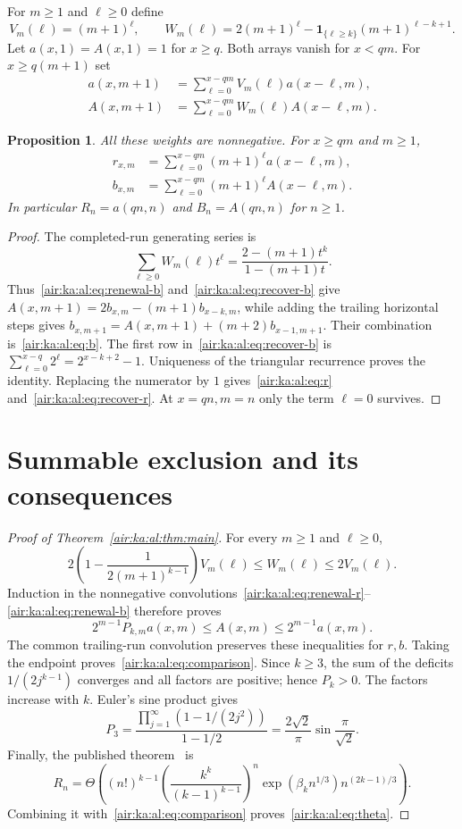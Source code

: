 \documentclass[11pt,letterpaper]{article}
\numberwithin{equation}{section}
\newtheorem{proposition}[theorem]{Proposition}
\theoremstyle{remark}
\begin{document}
For $m\ge1$ and $\ell\ge0$ define
\begin{equation}\label{air:ka:al:eq:weights}
V_m(\ell)=(m+1)^\ell,\qquad
W_m(\ell)=2(m+1)^\ell-
\mathbf1_{\{\ell\ge k\}}(m+1)^{\ell-k+1}.
\end{equation}
Let $a(x,1)=A(x,1)=1$ for $x\ge q$. Both arrays vanish for $x<qm$.
For $x\ge q(m+1)$ set
\begin{align}
a(x,m+1)&=\sum_{\ell=0}^{x-qm}V_m(\ell)a(x-\ell,m),\label{air:ka:al:eq:renewal-r}\\
A(x,m+1)&=\sum_{\ell=0}^{x-qm}W_m(\ell)A(x-\ell,m).\label{air:ka:al:eq:renewal-b}
\end{align}
\begin{proposition}\label{air:ka:al:prop:renewal}
All these weights are nonnegative. For $x\ge qm$ and $m\ge1$,
\begin{align}
r_{x,m}&=\sum_{\ell=0}^{x-qm}(m+1)^\ell a(x-\ell,m),\label{air:ka:al:eq:recover-r}\\
b_{x,m}&=\sum_{\ell=0}^{x-qm}(m+1)^\ell A(x-\ell,m).\label{air:ka:al:eq:recover-b}
\end{align}
In particular $R_n=a(qn,n)$ and $B_n=A(qn,n)$ for $n\ge1$.
\end{proposition}
\begin{proof}
The completed-run generating series is
\[
\sum_{\ell\ge0}W_m(\ell)t^\ell
=\frac{2-(m+1)t^k}{1-(m+1)t}.
\]
Thus~\eqref{air:ka:al:eq:renewal-b} and~\eqref{air:ka:al:eq:recover-b} give
$A(x,m+1)=2b_{x,m}-(m+1)b_{x-k,m}$, while adding the trailing
horizontal steps gives
$b_{x,m+1}=A(x,m+1)+(m+2)b_{x-1,m+1}$.
Their combination is~\eqref{air:ka:al:eq:b}. The first row in~\eqref{air:ka:al:eq:recover-b}
is $\sum_{\ell=0}^{x-q}2^\ell=2^{x-k+2}-1$.
Uniqueness of the triangular recurrence proves the identity.
Replacing the numerator by $1$ gives~\eqref{air:ka:al:eq:r} and~\eqref{air:ka:al:eq:recover-r}.
At $x=qn,m=n$ only the term $\ell=0$ survives.
\end{proof}

\section{Summable exclusion and its consequences}
\begin{proof}[Proof of Theorem~\ref{air:ka:al:thm:main}]
For every $m\ge1$ and $\ell\ge0$,
\[
2\left(1-\frac1{2(m+1)^{k-1}}\right)V_m(\ell)
\le W_m(\ell)\le2V_m(\ell).
\]
Induction in the nonnegative convolutions~\eqref{air:ka:al:eq:renewal-r}--\eqref{air:ka:al:eq:renewal-b}
therefore proves
\[
2^{m-1}P_{k,m}a(x,m)\le A(x,m)\le2^{m-1}a(x,m).
\]
The common trailing-run convolution preserves these inequalities for
$r,b$. Taking the endpoint proves~\eqref{air:ka:al:eq:comparison}.
Since $k\ge3$, the sum of the deficits $1/(2j^{k-1})$ converges and all
factors are positive; hence $P_k>0$. The factors increase with $k$.
Euler's sine product gives
\[
P_3=\frac{\prod_{j=1}^{\infty}(1-1/(2j^2))}{1-1/2}
=\frac{2\sqrt2}{\pi}\sin\frac{\pi}{\sqrt2}.
\]
Finally, the published theorem~\cite{gdw} is
\[
R_n=\Theta\!\left((n!)^{k-1}
\left(\frac{k^k}{(k-1)^{k-1}}\right)^n
\exp(\beta_kn^{1/3})n^{(2k-1)/3}\right).
\]
Combining it with~\eqref{air:ka:al:eq:comparison} proves~\eqref{air:ka:al:eq:theta}.
\end{proof}
\end{document}
